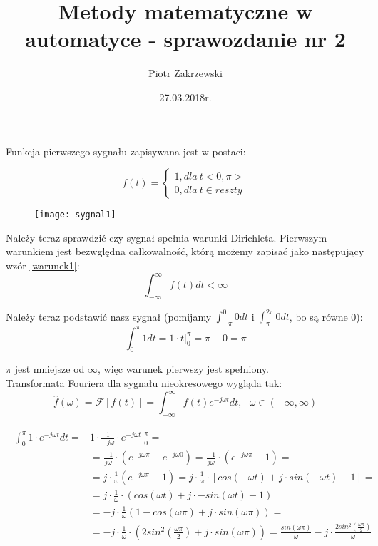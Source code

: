 \documentclass[11pt,a4paper]{article}
\title{Metody matematyczne w automatyce - sprawozdanie nr 2}
\author{Piotr Zakrzewski}
\date{27.03.2018r.}
\begin{document}
\maketitle
Funkcja pierwszego sygnału zapisywana jest w postaci:

\[
    f(t) =\left\{
                \begin{array}{ll}
                  1, dla\ t <0,\pi> \\
                  0, dla\ t \in reszty
                \end{array}
              \right.
\]
\begin{figure}[h]
\centering
\texttt{[image: sygnal1]}
\end{figure}

Należy teraz sprawdzić czy sygnał spełnia warunki Dirichleta. Pierwszym warunkiem jest bezwględna całkowalność, którą możemy zapisać jako następujący wzór \ref{warunek1}: \\
\begin{equation}
\int_{-\infty}^{\infty} f(t) dt < \infty
\label{warunek1}
\tag{1.1}
\end{equation}

Należy teraz podstawić nasz sygnał (pomijamy $ \int_{-\pi}^{0} 0 dt $ i $ \int_{\pi}^{2\pi} 0 dt $, bo są równe 0): \\
\begin{equation}
\int_{0}^{\pi} 1 dt = 1 \cdot t \Big|^\pi_0 = \pi - 0 = \pi
\end{equation}

$ \pi $ jest mniejsze od $ \infty $, więc warunek pierwszy jest spełniony. \\

Transformata Fouriera dla sygnału nieokresowego wygląda tak: \\
\begin{equation}
\hat{f} (\omega) = \mathcal{F}[f(t)] = \int_{-\infty}^{\infty} f(t) e^{-j \omega t} dt, \ \ \ \omega \in (-\infty,\infty)
\end{equation}

\begin{align}
\begin{split}
\int_{0}^{\pi} 1 \cdot e^{-j \omega t} dt = &{} 1 \cdot \frac{1}{-j \omega } \cdot e^{-j \omega t} \Big|^\pi_0 = \\
&{} = \frac{-1}{j \omega} \cdot (e^{-j \omega \pi} - e^{-j \omega 0}) = \frac{-1}{j \omega} \cdot (e^{-j \omega \pi} - 1) = \\
&{} = j \cdot \frac{1}{\omega}(e^{-j \omega \pi} - 1) = j \cdot \frac{1}{\omega} \cdot [cos(-\omega t) + j \cdot sin(-\omega t) - 1] = \\
&{} = j \cdot \frac{1}{\omega} \cdot (cos(\omega t) + j \cdot -sin(\omega t) - 1)\\
&{} = -j \cdot \frac{1}{\omega}(1 - cos(\omega \pi) + j \cdot sin(\omega \pi)) = \\
&{} = -j \cdot \frac{1}{\omega} \cdot (2sin^2(\frac{\omega \pi}{2}) + j \cdot sin(\omega \pi)) = \frac{sin(\omega \pi)}{\omega} - j \cdot \frac{2sin^2(\frac{\omega \pi}{2})}{\omega}
\end{split}
\end{align}
\end{document}

